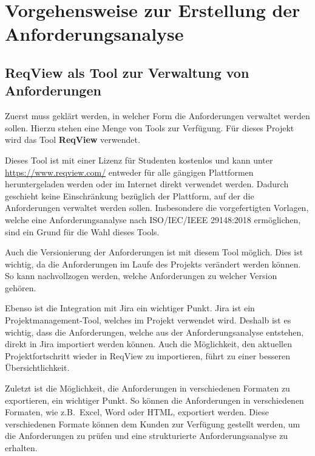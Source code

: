 \section{Vorgehensweise zur Erstellung der Anforderungsanalyse}
\subsection{ReqView als Tool zur Verwaltung von Anforderungen}\label{sec:tool}
Zuerst muss geklärt werden, in welcher Form die Anforderungen verwaltet werden sollen.
Hierzu stehen eine Menge von Tools zur Verfügung.
Für dieses Projekt wird das Tool \textbf{ReqView} verwendet.

Dieses Tool ist mit einer Lizenz für Studenten kostenlos und kann unter \url{https://www.reqview.com/} entweder für alle gängigen Plattformen heruntergeladen werden oder im Internet direkt verwendet werden.
Dadurch geschieht keine Einschränkung bezüglich der Plattform, auf der die Anforderungen verwaltet werden sollen.
Insbesondere die vorgefertigten Vorlagen, welche eine Anforderungsanalyse nach ISO/IEC/IEEE 29148:2018 ermöglichen, sind ein Grund für die Wahl dieses Tools.

Auch die Versionierung der Anforderungen ist mit diesem Tool möglich.
Dies ist wichtig, da die Anforderungen im Laufe des Projekts verändert werden können.
So kann nachvollzogen werden, welche Anforderungen zu welcher Version gehören.

Ebenso ist die Integration mit Jira ein wichtiger Punkt.
Jira ist ein Projektmanagement-Tool, welches im Projekt verwendet wird.
Deshalb ist es wichtig, dass die Anforderungen, welche aus der Anforderungsanalyse entstehen, direkt in Jira importiert werden können.
Auch die Möglichkeit, den aktuellen Projektfortschritt wieder in ReqView zu importieren, führt zu einer besseren Übersichtlichkeit.

Zuletzt ist die Möglichkeit, die Anforderungen in verschiedenen Formaten zu exportieren, ein wichtiger Punkt.
So können die Anforderungen in verschiedenen Formaten, wie z.B.\ Excel, Word oder HTML, exportiert werden.
Diese verschiedenen Formate können dem Kunden zur Verfügung gestellt werden, um die Anforderungen zu prüfen und eine strukturierte Anforderungsanalyse zu erhalten\autocite[vgl.][]{eccam.2023}.
